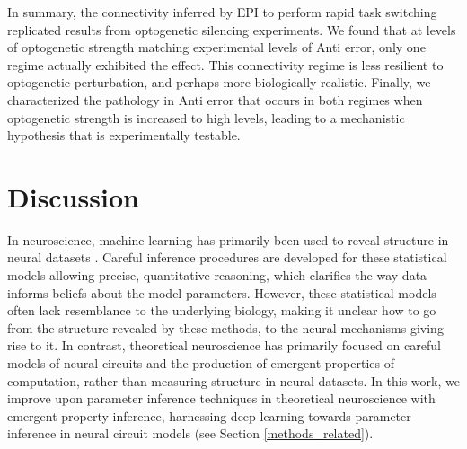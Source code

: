 \documentclass[11pt]{article}
\begin{document}
In summary, the connectivity inferred by EPI to perform rapid task switching replicated results from optogenetic silencing experiments.
We found that at levels of optogenetic strength matching experimental levels of Anti error, only one regime actually exhibited the effect.  
This connectivity regime is less resilient to optogenetic perturbation, and perhaps more biologically realistic.
Finally, we characterized the pathology in Anti error that occurs in both regimes when optogenetic strength is increased to high levels, leading to a mechanistic hypothesis that is experimentally testable.

\section{Discussion} \label{discussion}
In neuroscience, machine learning has primarily been used to reveal structure in neural datasets \cite{paninski2018neural}.
Careful inference procedures are developed for these statistical models allowing precise, quantitative reasoning, which clarifies the way data informs beliefs about the model parameters.  
However, these statistical models often lack resemblance to the underlying biology, making it unclear how to go from the structure revealed by these methods, to the neural mechanisms giving rise to it. 
In contrast, theoretical neuroscience has primarily focused on careful models of neural circuits and the production of emergent properties of computation, rather than measuring structure in neural datasets.
In this work, we improve upon parameter inference techniques in theoretical neuroscience with emergent property inference, harnessing deep learning towards parameter inference in neural circuit models (see Section \ref{methods_related}).
\end{document}
